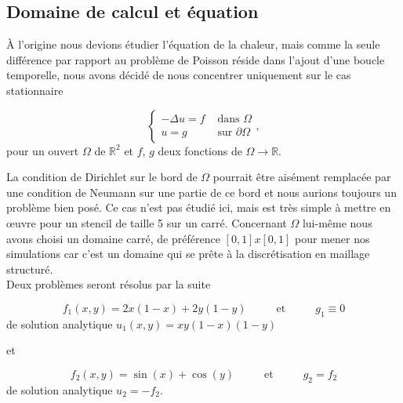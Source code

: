\documentclass[a4paper,11pt]{article}
\begin{document}
\subsection{Domaine de calcul et équation}
\noindent À l'origine nous devions étudier l'équation de la chaleur, mais comme la seule différence par rapport au problème de Poisson réside dans l'ajout d'une boucle temporelle, nous avons décidé de nous concentrer uniquement sur le cas stationnaire
\begin{tcolorbox}[colback=MyRed!5!white,colframe=MyRed,halign=left,leftrule=3mm, rightrule=0mm, toprule=0mm, bottomrule=0mm]
	\begin{equation}
		\begin{cases}
			-\Delta u = f & \text{ dans $\Omega$}\\
			u = g & \text{ sur $\partial \Omega$}
		\end{cases},\label{eq:poisson}
	\end{equation}
	pour un ouvert $\Omega$ de $\mathbb{R}^2$ et $f$, $g$ deux fonctions de $\Omega \to \mathbb{R}$.
\end{tcolorbox}
 \noindent La condition de Dirichlet sur le bord de $\Omega$ pourrait être aisément remplacée par une condition de Neumann sur une partie de ce bord et nous aurions toujours un problème bien posé. Ce cas n'est pas étudié ici, mais est très simple à mettre en \oe uvre pour un stencil de taille 5 sur un carré. Concernant $\Omega$ lui-même nous avons choisi un domaine carré, de préférence $\left[0, 1\right] x \left[0, 1\right]$ pour mener nos simulations car c'est un domaine qui se prête à la discrétisation en maillage structuré.\\

\noindent Deux problèmes seront résolus par la suite
\begin{tcolorbox}[colback=MyRed!5!white,colframe=MyRed,halign=left,leftrule=3mm, rightrule=0mm, toprule=0mm, bottomrule=0mm]
	\begin{equation}
		f_1(x, y) = 2 x (1-x) + 2y(1-y) \hspace{1cm}\text{ et }\hspace{1cm} g_1 \equiv 0 \label{eq:problem1}\tag{$\star$}
	\end{equation}
	de solution analytique $u_1(x, y) = xy(1-x)(1-y)$
\end{tcolorbox}
\noindent et 
\begin{tcolorbox}[colback=MyRed!5!white,colframe=MyRed,halign=left,leftrule=3mm, rightrule=0mm, toprule=0mm, bottomrule=0mm]
	\begin{equation}
	f_2(x, y) = \sin\left(x\right) + \cos\left(y\right) \hspace{1cm}\text{ et }\hspace{1cm} g_2 = f_2 \label{eq:problem2}\tag{$\star\star$}
	\end{equation}
	de solution analytique $ u_2 = - f_2$.
\end{tcolorbox}
\end{document}
